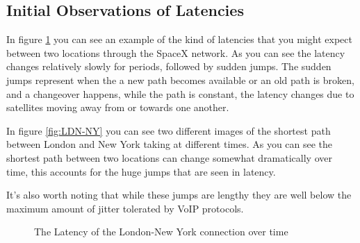 \documentclass[12pt,a4paper,twoside,openright]{report}
\begin{document}
\subsection{Initial Observations of Latencies}

In figure \ref{fig:Latency London To New York} you can see an example of the kind of latencies that you might expect between two locations through the SpaceX network. As you can see the latency changes relatively slowly for periods, followed by sudden jumps. The sudden jumps represent when the a new path becomes available or an old path is broken, and a changeover happens, while the path is constant, the latency changes due to satellites moving away from or towards one another.

In figure \ref{fig:LDN-NY} you can see two different images of the shortest path between London and New York taking at different times. As you can see the shortest path between two locations can change somewhat dramatically over time, this accounts for the huge jumps that are seen in latency.

It's also worth noting that while these jumps are lengthy they are well below the maximum amount of jitter tolerated by VoIP protocols.\cite{HowMuchJitter}

\begin{figure}
\caption{The Latency of the London-New York connection over time}
\label{fig:Latency London To New York}
\end{figure}
\end{document}

